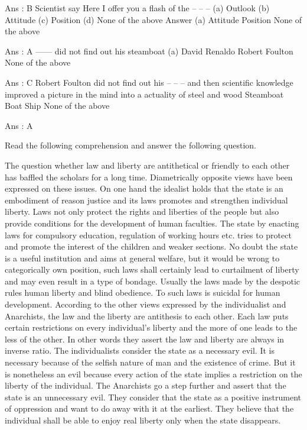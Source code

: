         Ans : B
        Scientist say Here I offer you a flash of the -- -- --
            (a) Outlook (b) Attitude (c) Position (d) None of the above Answer (a)
            Attitude
            Position
            None of the above 

        Ans : A
        ------ did not find out his steamboat
            (a) David
            Renaldo
            Robert Foulton
            None of the above 

        Ans : C
        Robert Foulton did not find out his -- -- -- and then scientific knowledge improved a picture in the mind into a actuality of steel and wood
            Steamboat
            Boat
            Ship
            None of the above 

        Ans : A 




Read the following comprehension and answer the following question.

    The question whether law and liberty are antithetical or friendly to each other has baffled the scholars for a long time. Diametrically opposite views have been expressed on these issues. On one hand the idealist holds that the state is an embodiment of reason justice and its laws promotes and strengthen individual liberty. Laws not only protect the rights and liberties of the people but also provide conditions for the development of human faculties. The state by enacting laws for compulsory education, regulation of working hours etc. tries to protect and promote the interest of the children and weaker sections. No doubt the state is a useful institution and aims at general welfare, but it would be wrong to categorically own position, such laws shall certainly lead to curtailment of liberty and may even result in a type of bondage. Usually the laws made by the despotic rules human liberty and blind obedience. To such laws is suicidal for human development. According to the other views expressed by the individualist and Anarchists, the law and the liberty are antithesis to each other. Each law puts certain restrictions on every individual’s liberty and the more of one leads to the less of the other. In other words they assert the law and liberty are always in inverse ratio. The individualists consider the state as a necessary evil. It is necessary because of the selfish nature of man and the existence of crime. But it is nonetheless an evil because every action of the state implies a restriction on the liberty of the individual. The Anarchists go a step further and assert that the state is an unnecessary evil. They consider that the state as a positive instrument of oppression and want to do away with it at the earliest. They believe that the individual shall be able to enjoy real liberty only when the state disappears.

